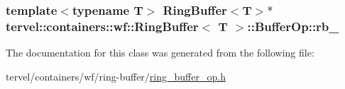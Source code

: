 \subsubsection[{rb\+\_\+}]{\setlength{\rightskip}{0pt plus 5cm}template$<$typename T$>$ {\bf Ring\+Buffer}$<$T$>$$\ast$ {\bf tervel\+::containers\+::wf\+::\+Ring\+Buffer}$<$ T $>$\+::Buffer\+Op\+::rb\+\_\+}\label{classtervel_1_1containers_1_1wf_1_1_ring_buffer_1_1_buffer_op_a2f8fe07f0f1b404a6cecb43564795973}


The documentation for this class was generated from the following file\+:\begin{DoxyCompactItemize}
\item 
tervel/containers/wf/ring-\/buffer/\hyperlink{ring__buffer__op_8h}{ring\+\_\+buffer\+\_\+op.\+h}\end{DoxyCompactItemize}
